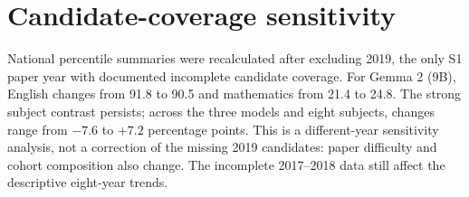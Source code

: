 \documentclass[preprint,12pt,authoryear,nonatbib]{elsarticle}
\begin{document}
\begin{table}[H]\centering\footnotesize
\caption{Distribution of selected answer letters (\%) on S1 in original option order (1,700 items)}\label{tab:letters}

\end{table}

\begin{table}[H]\centering\footnotesize
\caption{Option-order comparison restricted to 1,621 items whose order actually changed (17 unparseable option sets and 62 identity permutations excluded)}\label{tab:shufflechanged}

\end{table}

\section{Candidate-coverage sensitivity}
\setcounter{table}{0}
National percentile summaries were recalculated after excluding 2019, the only S1 paper year with documented incomplete candidate coverage. For Gemma 2 (9B), English changes from 91.8 to 90.5 and mathematics from 21.4 to 24.8. The strong subject contrast persists; across the three models and eight subjects, changes range from $-7.6$ to $+7.2$ percentage points. This is a different-year sensitivity analysis, not a correction of the missing 2019 candidates: paper difficulty and cohort composition also change. The incomplete 2017--2018 data still affect the descriptive eight-year trends.
\begin{table}[H]\centering\footnotesize
\caption{Mean national percentiles including and excluding the incomplete 2019 candidate cohort}\label{tab:coverage}

\end{table}
\end{document}
